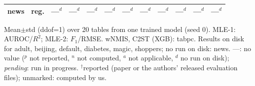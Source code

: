 \begin{table}[t]
{\begin{tabular}{llcccccccccc}
news & reg. & ---$^{d}$ & ---$^{d}$ & ---$^{d}$ & ---$^{d}$ & ---$^{d}$ & ---$^{d}$ & ---$^{d}$ & ---$^{d}$ & ---$^{d}$ & ---$^{d}$ \\
\bottomrule
\end{tabular}}
\par\smallskip\footnotesize Mean$\pm$std (ddof=1) over 20 tables from one trained model (seed 0). MLE-1: AUROC/$R^2$; MLE-2: $F_1$/RMSE. wNMIS, C2ST (XGB): tabpc. Results on disk for adult, beijing, default, diabetes, magic, shoppers; no run on disk: news. ---: no value ($^{p}$ not reported, $^{n}$ not computed, $^{a}$ not applicable, $^{d}$ no run on disk); \emph{pending}: run in progress. $^\dagger$reported (paper or the authors' released evaluation files); unmarked: computed by us.
\end{table}

